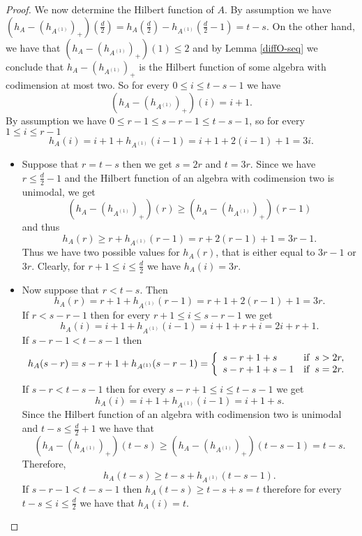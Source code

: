 \documentclass[12pt]{amsart}
\numberwithin{equation}{section}
\theoremstyle{plain} \newtheorem{theorem}{Theorem}[section]
\theoremstyle{definition} \newtheorem{definition}[theorem]{Definition}
\begin{document}
\begin{proof}
We now determine the Hilbert function of $A$. By assumption we have $(h_A-(h_{A^{(1)}})_+)({\frac{d}{2}})= h_{A}(\frac{d}{2})-h_{A^{(1)}}(\frac{d}{2}-1)=t-s$. On the other hand, we have that $(h_{A}-(h_{A^{(1)}})_+)(1)\leq 2$ and by Lemma \ref{diffO-seq} we conclude that $h_{A}-(h_{A^{(1)}})_+$ is the Hilbert function of some algebra with codimension at most two. So for every $0\leq i\leq t-s-1$ we have 
$$
(h_A-(h_{A^{(1)}})_+)({i}) = i+1.
$$
By assumption we have $0\leq r-1\leq s-r-1\leq t-s-1$, so for every $1\leq i\leq r-1$
$$
h_A(i) =i+1+h_{A^{(1)}}(i-1)= i+1+2(i-1)+1=3i.
$$
\begin{itemize}
\item Suppose that $r=t-s$ then we get $s=2r$ and $t=3r$. Since we have $r\leq \frac{d}{2}-1$ and the Hilbert function of an  algebra with codimension two is unimodal, we get
$$
\left(h_A-(h_{A^{(1)}})_+\right)({r})\geq \left(h_A-(h_{A^{(1)}})_+\right)({r-1})
$$ and thus 
$$h_A(r)\geq r+h_{A^{(1)}}(r-1) = r+2(r-1)+1=3r-1.
$$
Thus we have two possible values for $h_A(r)$, that is either equal to $3r-1$ or $3r$. Clearly, for $r+1\leq i\leq \frac{d}{2}$  we have $h_A(i)=3r$. 
\item Now suppose that $r<t-s$. Then $$h_A(r) = r+1+h_{A^{(1)}}(r-1)=r+1+2(r-1)+1=3r.$$
If $r<s-r-1$ then for every $r+1\leq i\leq s-r-1$ we get 
$$
h_A(i)=i+1+h_{A^{(1)}}(i-1) = i+1+r+i=2i+r+1.
$$
If $s-r-1<t-s-1$ then 
\begin{equation*}
h_A(s-r) =s-r+1+h_{A^{(1)}}(s-r-1) = \left\{
                \begin{array}{ll}
                  s-r+1+s &  \text{if}\hspace*{2mm} s>2r,\\
                  s-r+1+s-1 & \text{if}\hspace*{2mm} s=2r.\\
                \end{array}
              \right.
\end{equation*}
If $s-r<t-s-1$ then for every $s-r+1\leq i\leq t-s-1$ we get 
$$
h_A(i)=i+1+h_{A^{(1)}}(i-1)=i+1+s.
$$
Since the Hilbert function of an algebra with codimension two is unimodal and $t-s\leq \frac{d}{2}+1$ we have that
$$
\left(h_A-(h_{A^{(1)}})_+\right)({t-s})\geq \left(h_A-(h_{A^{(1)}})_+\right)({t-s-1})=t-s.
$$
Therefore, 
\begin{equation}\label{h(t-s)}
h_A(t-s)\geq t-s+h_{A^{(1)}}(t-s-1).
\end{equation}
If $s-r-1<t-s-1$ then $h_A(t-s) \geq t-s+s = t$ therefore for every $t-s\leq i\leq \frac{d}{2}$ we have that $h_A(i)=t$.


\end{itemize}
\end{proof}
\end{document}
